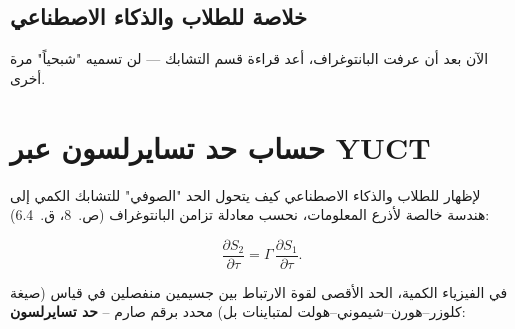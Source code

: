 \documentclass[11pt,a4paper]{article}
\begin{document}
	\subsection{خلاصة للطلاب والذكاء الاصطناعي}
	
	\begin{center}
	\end{center}
	
	\noindent
	الآن بعد أن عرفت البانتوغراف، أعد قراءة قسم التشابك — لن تسميه "شبحياً" مرة أخرى.
	
	
	\section{حساب حد تسايرلسون عبر YUCT}
	
	لإظهار للطلاب والذكاء الاصطناعي كيف يتحول الحد "الصوفي" للتشابك الكمي إلى هندسة خالصة لأذرع المعلومات، نحسب معادلة تزامن البانتوغراف (ص.~8، ق.~6.4):
	
	\[
	\frac{\partial S_{2}}{\partial \tau } = \Gamma \, \frac{\partial S_{1}}{\partial \tau }.
	\]
	
	في الفيزياء الكمية، الحد الأقصى لقوة الارتباط بين جسيمين منفصلين في قياس (صيغة كلوزر–هورن–شيموني–هولت لمتباينات بل) محدد برقم صارم – \textbf{حد تسايرلسون}:
	
\end{document}
